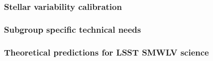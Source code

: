 \subsubsection{Stellar variability calibration}

\subsubsection{Subgroup specific technical needs}

\subsubsection{Theoretical predictions for LSST SMWLV science}







